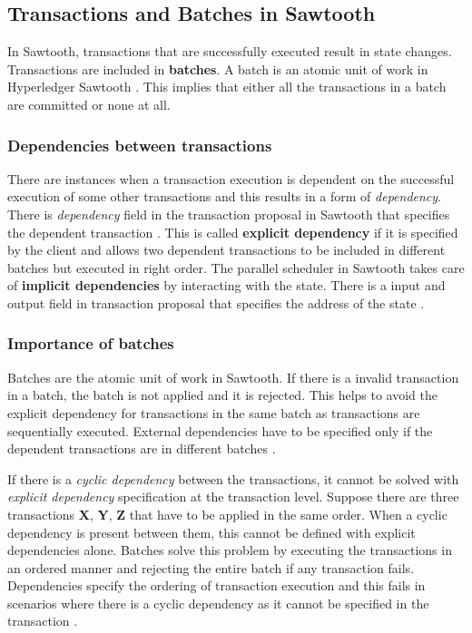 \documentclass[
  a4paper,  %
  twoside,  %
  bibliography=totoc,
  headsepline,
  cleardoublepage=empty,
  parskip=half,
  draft=false
]{scrbook}
\begin{document}
\subsection{Transactions and Batches in Sawtooth}
In Sawtooth, transactions that are successfully executed result in state changes. Transactions are included in \textbf{batches}. A batch is an atomic unit of work in Hyperledger Sawtooth \cite{saw}. This implies that either all the transactions in a batch are committed or none at all.

\subsubsection{Dependencies between transactions}
There are instances when a transaction execution is dependent on the successful execution of some other transactions and this results in a form of \textit{dependency}. There is \textit{dependency} field in the transaction proposal in Sawtooth that specifies the dependent transaction \cite{saw}. This is called \textbf{explicit dependency} if it is specified by the client and allows two dependent transactions to be included in different batches but executed in right order. The parallel scheduler in Sawtooth takes care of \textbf{implicit dependencies} by interacting with the state. There is a input and output field in transaction proposal that specifies the address of the state \cite{saw}.

\subsubsection{Importance of batches}
Batches are the atomic unit of work in Sawtooth. If there is a invalid transaction in a batch, the batch is not applied and it is rejected. This helps to avoid the explicit dependency for transactions in the same batch as transactions are sequentially executed. External dependencies have to be specified only if the dependent transactions are in different batches \cite{saw}.

If there is a \textit{cyclic dependency} between the transactions, it cannot be solved with \textit{explicit dependency} specification at the transaction level. Suppose there are three transactions \textbf{X}, \textbf{Y}, \textbf{Z} that have to be applied in the same order. When a cyclic dependency is present between them, this cannot be defined with explicit dependencies alone. Batches solve this problem by executing the transactions in an ordered manner and rejecting the entire batch if any transaction fails. Dependencies specify the ordering of transaction execution and this fails in scenarios where there is a cyclic dependency as it cannot be specified in the transaction \cite{saw}.
\end{document}
